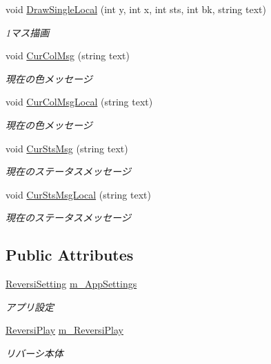 \begin{DoxyCompactItemize}
void \hyperlink{class_reversi_form_1_1_reversi_aaa7228857f9476b7950b0af1524abf44}{Draw\+Single\+Local} (int y, int x, int sts, int bk, string text)
\begin{DoxyCompactList}\small\item\em 1マス描画 \end{DoxyCompactList}\item 
void \hyperlink{class_reversi_form_1_1_reversi_ad09577aef8bf515ee495c82a981dfd7d}{Cur\+Col\+Msg} (string text)
\begin{DoxyCompactList}\small\item\em 現在の色メッセージ \end{DoxyCompactList}\item 
void \hyperlink{class_reversi_form_1_1_reversi_a0d919be21fe5961a177e26b5752320b9}{Cur\+Col\+Msg\+Local} (string text)
\begin{DoxyCompactList}\small\item\em 現在の色メッセージ \end{DoxyCompactList}\item 
void \hyperlink{class_reversi_form_1_1_reversi_af5009aa7b1b255b9dec7028d8a7c53f7}{Cur\+Sts\+Msg} (string text)
\begin{DoxyCompactList}\small\item\em 現在のステータスメッセージ \end{DoxyCompactList}\item 
void \hyperlink{class_reversi_form_1_1_reversi_a934897d68f7709c32b6fd126351c5f05}{Cur\+Sts\+Msg\+Local} (string text)
\begin{DoxyCompactList}\small\item\em 現在のステータスメッセージ \end{DoxyCompactList}\end{DoxyCompactItemize}
\subsection*{Public Attributes}
\begin{DoxyCompactItemize}
\item 
\mbox{\label{class_reversi_form_1_1_reversi_ae249a833eae1b8b11e3951d3b27fcba0}} 
\hyperlink{class_reversi_form_1_1_reversi_setting}{Reversi\+Setting} \hyperlink{class_reversi_form_1_1_reversi_ae249a833eae1b8b11e3951d3b27fcba0}{m\+\_\+\+App\+Settings}
\begin{DoxyCompactList}\small\item\em アプリ設定 \end{DoxyCompactList}\item 
\mbox{\label{class_reversi_form_1_1_reversi_a95773c9b8c364a754ca27a4ce8a9bb16}} 
\hyperlink{class_reversi_form_1_1_reversi_play}{Reversi\+Play} \hyperlink{class_reversi_form_1_1_reversi_a95773c9b8c364a754ca27a4ce8a9bb16}{m\+\_\+\+Reversi\+Play}
\begin{DoxyCompactList}\small\item\em リバーシ本体 \end{DoxyCompactList}\end{DoxyCompactItemize}

